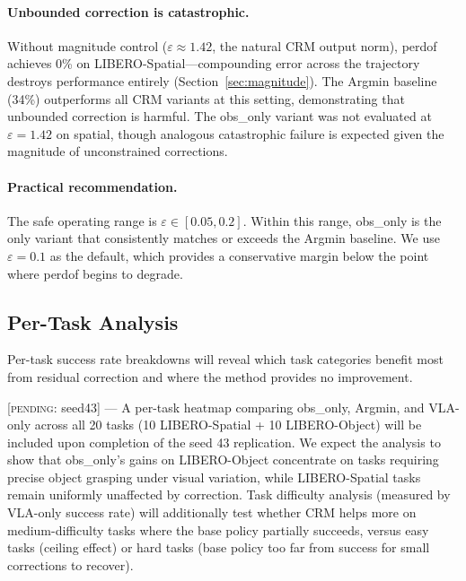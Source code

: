 \paragraph{Unbounded correction is catastrophic.}
Without magnitude control ($\varepsilon{\approx}1.42$, the natural CRM output norm), perdof achieves 0\% on LIBERO-Spatial---compounding error across the trajectory destroys performance entirely (Section~\ref{sec:magnitude}).
The Argmin baseline (34\%) outperforms all CRM variants at this setting, demonstrating that unbounded correction is harmful.
The obs\_only variant was not evaluated at $\varepsilon{=}1.42$ on spatial, though analogous catastrophic failure is expected given the magnitude of unconstrained corrections.

\paragraph{Practical recommendation.}
The safe operating range is $\varepsilon \in [0.05, 0.2]$.
Within this range, obs\_only is the only variant that consistently matches or exceeds the Argmin baseline.
We use $\varepsilon{=}0.1$ as the default, which provides a conservative margin below the point where perdof begins to degrade.


\subsection{Per-Task Analysis}
\label{sec:per_task}

Per-task success rate breakdowns will reveal which task categories benefit most from residual correction and where the method provides no improvement.

[\textsc{pending}: seed43] --- A per-task heatmap comparing obs\_only, Argmin, and VLA-only across all 20 tasks (10 LIBERO-Spatial + 10 LIBERO-Object) will be included upon completion of the seed 43 replication.
We expect the analysis to show that obs\_only's gains on LIBERO-Object concentrate on tasks requiring precise object grasping under visual variation, while LIBERO-Spatial tasks remain uniformly unaffected by correction.
Task difficulty analysis (measured by VLA-only success rate) will additionally test whether CRM helps more on medium-difficulty tasks where the base policy partially succeeds, versus easy tasks (ceiling effect) or hard tasks (base policy too far from success for small corrections to recover).
